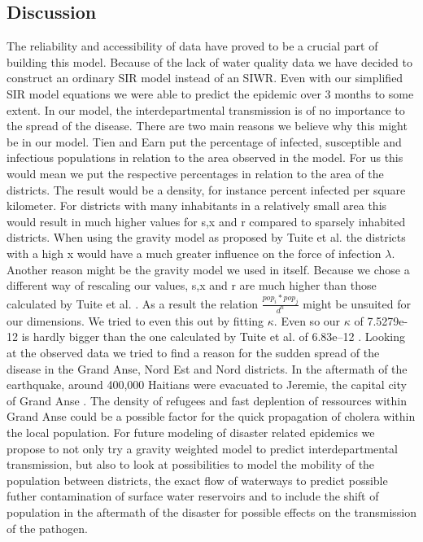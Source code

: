 \documentclass[11pt]{article}
\begin{document}
{\subsection{Discussion} 
The reliability and accessibility of data have proved to be a crucial part of building this model. Because of the lack of water quality data we have decided to construct an ordinary SIR model instead of an SIWR. Even with our simplified SIR model equations we were able to predict the epidemic over 3 months to some extent. In our model, the interdepartmental transmission is of no importance to the spread of the disease. There are two main reasons we believe why this might be in our model. Tien and Earn \cite{tien:2010} put the percentage of infected, susceptible and infectious populations in relation to the area observed in the model. For us this would mean we put the respective percentages in relation to the area of the districts. The result would be a density, for instance percent infected per square kilometer. For districts with many inhabitants in a relatively small area this would result in much higher values for s,x and r compared to sparsely inhabited districts. When using the gravity model as proposed by Tuite et al. \cite{tuite:2011} the districts with a high x would have a much greater influence on the force of infection $\lambda$.\\
Another reason might be the gravity model we used in itself. Because we chose a different way of rescaling our values, s,x and r are much higher than those calculated by Tuite et al. \cite{tuite:2011}. As a result the relation $\frac{pop_{i}*pop_{j}}{d^{n}}$ might be unsuited for our dimensions. We tried to even this out by fitting $\kappa$. Even so our $\kappa$ of 7.5279e-12 is hardly bigger than the one calculated by Tuite et al. of 6.83e–12 \cite{tuite:2011}. Looking at the observed data we tried to find a reason for the sudden spread of the disease in the Grand Anse, Nord Est and Nord districts. In the aftermath of the earthquake, around 400,000 Haitians were evacuated to Jeremie, the capital city of Grand Anse \cite{web:appo}. The density of refugees and fast deplention of ressources within Grand Anse could be a possible factor for the quick propagation of cholera within the local population. For future modeling of disaster related epidemics we propose to not only try a gravity weighted model to predict interdepartmental transmission, but also to look at possibilities to model the mobility of the population between districts, the exact flow of waterways to predict possible futher contamination of surface water reservoirs and to include the shift of population in the aftermath of the disaster for possible effects on the transmission of the pathogen.









}
\end{document}
